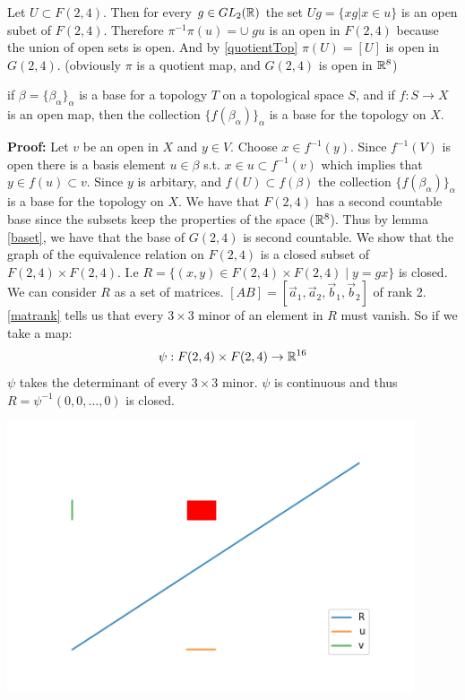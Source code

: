 \documentclass[11pt,a4paper]{report}
\begin{document}
Let $U \subset F(2,4)$. Then for every $g \in GL_2(\mathbb{R})$ the set $U g = \{ x g | x \in u \}$ is an open subet of $F(2,4)$.
Therefore $\pi^{-1}\pi(u) = \displaystyle \cup \; g u$ is an open in $F(2,4)$ because the union of open sets is open.
And by \ref{quotientTop} $\pi(U) = [U]$ is open in $G(2,4)$. (obviously $\pi$ is a quotient map, and $G(2,4)$ is open in $\mathbb{R}^8$)
\newline
\newline
\begin{Lemma}
    \label{baset}
    if $\beta = \{ \beta_\alpha \}_\alpha$ is a base for a topology $T$ on a topological space $S$,
    and if $f: S \to X$ is an open map, then the collection $\{ f (\beta_\alpha) \}_\alpha$ is a base for the topology on $X$.
\end{Lemma}
\textbf{Proof:} Let $v$ be an open in $X$ and $y \in V$. Choose $x \in f^{-1}(y)$. 
Since $f^{-1} (V)$ is open there is a basis element $u \in \beta$ s.t. $x \in u \subset f^{-1}(v)$
which implies that $y \in f(u) \subset v$. Since $y$ is arbitary, and $f(U) \subset f(\beta)$ the collection $\{ f (\beta_\alpha) \}_\alpha$ is a base for the topology on $X$.
\newline
\newline
We have that $F(2,4)$ has a second countable base since the subsets keep the properties of the space ($\mathbb{R}^8$).
Thus by lemma \ref{baset}, we have that the base of $G(2,4)$ is second countable.
\newline
\newline
We show that the graph of the equivalence relation on $F(2,4)$ is a closed subset of $F(2,4) \times F(2,4)$.
I.e $R = \{ (x,y) \in F(2,4) \times F(2,4) \; | \; y = gx \}$ is closed.
We can consider $R$ as a set of matrices. $[A B] = [\vec{a}_1, \vec{a}_2, \vec{b}_1, \vec{b}_2]$ of rank 2.
\ref{matrank} tells us that every $3 \times 3$ minor of an element in $R$ must vanish. So if we take a map:
$$ \psi:  F(2,4) \times F(2,4) \to \mathbb{R}^{16} $$
$\psi$ takes the determinant of every $3 \times 3$ minor.
$\psi$ is continuous and thus $R = \psi^{-1}(0,0, \dots ,0)$ is closed.
\newline
\begin{center}
      \centering
      \includegraphics[width=0.90\textwidth]{graph_int.png}
\end{center}
\end{document}
